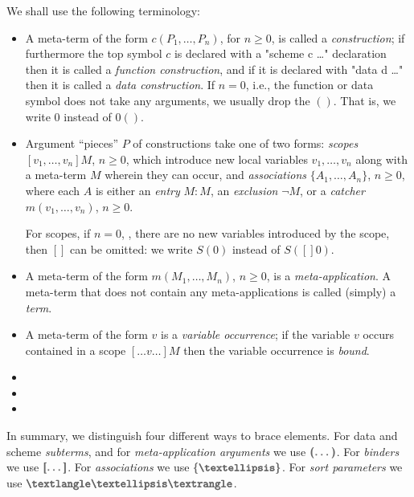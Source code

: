 \documentclass[letterpaper,11pt]{article}
\begin{document}
We shall use the following terminology:
\begin{itemize}

\item A meta-term of the form $c(P_1,…,P_n)$, for $n≥0$, is called a \emph{construction}; if furthermore
  the top symbol $c$ is declared with a "scheme c {…}" declaration then it is called a
  \emph{function construction}, and if it is declared with "data d {…}" then it is called a
  \emph{data construction}. If $n=0$, i.e., the function or data symbol does not take any arguments,
  we usually drop the $()$. That is, we write $0$ instead of $0()$.

\item Argument ``pieces'' $P$ of constructions take one of two forms: \emph{scopes} $[v_1,…,v_n]M$,
  $n≥0$, which introduce new local variables $v_1,…,v_n$ along with a meta-term $M$ wherein they can
  occur, and \emph{associations} $\{A_1,…,A_n\}$, $n≥0$, where each $A$ is either an \emph{entry}
  $M:M$, an \emph{exclusion} $¬M$, or a \emph{catcher} $m(v_1,…,v_n)$, $n≥0$.

  For scopes, if $n=0$, \ie, there are no new variables introduced by the scope, then $[]$ can be
  omitted: we write $S(0)$ instead of $S([]0)$.

\item A meta-term of the form $m(M_1,…,M_n)$, $n≥0$, is a \emph{meta-application}.  A meta-term that
  does not contain any meta-applications is called (simply) a \emph{term}.

\item A meta-term of the form $v$ is a \emph{variable occurrence}; if the variable $v$ occurs contained
  in a scope $[…v…]M$ then the variable occurrence is \emph{bound}.

\item {}

\item {}

\item {}

\end{itemize}

In summary, we distinguish four different ways to brace elements. For data and scheme
\emph{subterms}, and for \emph{meta-application arguments} we use $\kw{(…)}$.  For \emph{binders} we
use $\kw{[…]}$.  For \emph{associations} we use $\kwm{\{…\}}$.  For \emph{sort parameters} we use
$\kwm{⟨…⟩}$.
\end{document}
